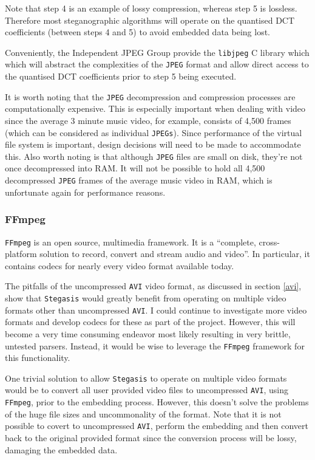 \documentclass[paper=a4, fontsize=11pt,twoside]{scrartcl}    %
\numberwithin{table}{section}
\numberwithin{figure}{section}
\begin{document}
\noindent
Note that step 4 is an example of lossy compression, whereas step 5 is lossless. Therefore most steganographic algorithms will operate on the quantised DCT coefficients (between steps 4 and 5) to avoid embedded data being lost.

Conveniently, the Independent JPEG Group provide the \texttt{libjpeg} C library which which will abstract the complexities of the \texttt{JPEG} format and allow direct access to the quantised DCT coefficients prior to step 5 being executed.

It is worth noting that the \texttt{JPEG} decompression and compression processes are computationally expensive. This is especially important when dealing with video since the average 3 minute music video, for example, consists of 4,500 frames (which can be considered as individual \texttt{JPEGs}). Since performance of the virtual file system is important, design decisions will need to be made to accommodate this. Also worth noting is that although \texttt{JPEG} files are small on disk, they're not once decompressed into RAM. It will not be possible to hold all 4,500 decompressed \texttt{JPEG} frames of the average music video in RAM, which is unfortunate again for performance reasons.

\subsubsection{FFmpeg}
\label{ffmpeg}

\texttt{FFmpeg} is an open source, multimedia framework. It is a ``complete, cross-platform solution to record, convert and stream audio and video''. In particular, it contains codecs for nearly every video format available today.  

The pitfalls of the uncompressed \texttt{AVI} video format, as discussed in section \ref{avi}, show that \texttt{Stegasis} would greatly benefit from operating on multiple video formats other than uncompressed \texttt{AVI}. I could continue to investigate more video formats and develop codecs for these as part of the project. However, this will become a very time consuming endeavor most likely resulting in very brittle, untested parsers. Instead, it would be wise to leverage the \texttt{FFmpeg} framework for this functionality.

One trivial solution to allow \texttt{Stegasis} to operate on multiple video formats would be to convert all user provided video files to uncompressed \texttt{AVI}, using \texttt{FFmpeg}, prior to the embedding process. However, this doesn't solve the problems of the huge file sizes and uncommonality of the format. Note that it is not possible to covert to uncompressed \texttt{AVI}, perform the embedding and then convert back to the original provided format since the conversion process will be lossy, damaging the embedded data.
\end{document}

